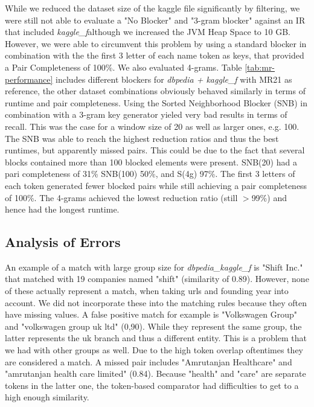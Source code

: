 \documentclass[11pt,titlepage,oneside,openany]{article}
\begin{document}
While we reduced the dataset size of the kaggle file significantly by filtering, we were still not able to evaluate a "No Blocker" and "3-gram blocker" against an IR that included \textit{kaggle\_f}although we increased the JVM Heap Space to 10 GB. However, we were able to circumvent this problem by using a standard blocker in combination with the the first 3 letter of each name token as keys, that provided a Pair Completeness of 100\%. We also evaluated 4-grams. Table \ref{tab:mr-performance} includes different blockers for \textit{dbpedia + kaggle\_f} with MR21 as reference, the other dataset combinations obviously behaved similarly in terms of runtime and pair completeness. Using the Sorted Neighborhood Blocker (SNB) in combination with a 3-gram key generator yieled very bad results in terms of recall. This was the case for a window size of 20 as well as larger ones, e.g. 100. The SNB was able to reach the highest reduction ratios and thus the best runtimes, but apparently missed pairs. This could be due to the fact that several blocks contained more than 100 blocked elements were present. SNB(20) had a pari completeness of 31\% SNB(100) 50\%, and S(4g) 97\%. The first 3 letters of each token generated fewer blocked pairs while still achieving a pair completeness of 100\%. The 4-grams achieved the lowest reduction ratio (still $>$99\%) and hence had the longest runtime.


\subsection{Analysis of Errors}
\label{sec:errors}
An example of a match with large group size for \textit{dbpedia\_kaggle\_f} is "Shift Inc." that matched with 19 companies named "shift" (similarity of 0.89). However, none of these actually represent a match, when taking urls and founding year into account. We did not incorporate these into the matching rules because they often have missing values.
A false positive match for example is "Volkswagen Group" and "volkswagen group uk ltd" (0,90). While they represent the same group, the latter represents the uk branch and thus a different entity. This is a problem that we had with other groups as well. Due to the high token overlap oftentimes they are considered a match.
A missed pair includes "Amrutanjan Healthcare" and "amrutanjan health care limited" (0.84). Because "health" and "care" are separate tokens in the latter one, the token-based comparator had difficulties to get to a high enough similarity.
\end{document}
